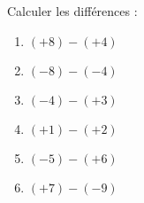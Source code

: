 
\begin{exercice}\label{exosmath-0725}

Calculer les différences :
\begin{enumerate}
    \item
        \( (+8)-(+4)\)
    \item
        \( (-8)-(-4)\)
    \item
        \( (-4)-(+3)\)
    \item
        \( (+1)-(+2)\)
    \item
        \( (-5)-(+6)\)
    \item
        \( (+7)-(-9)\)
\end{enumerate}

\end{exercice}
